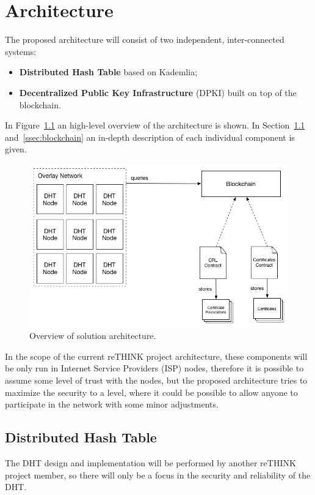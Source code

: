\chapter{Architecture}
\label{chapter:architecture}
The proposed architecture will consist of two independent, inter-connected systems:

\begin{itemize}
	\item \textbf{Distributed Hash Table} based on Kademlia;
	\item \textbf{Decentralized Public Key Infrastructure} (DPKI) built on top of the blockchain.
\end{itemize}

In Figure~\ref{fig:architecture-overview} an high-level overview of the architecture is shown. In Section~\ref{ssec:dht} and~\ref{ssec:blockchain} an in-depth description of each individual component is given.

\begin{figure}
    \includegraphics[width=\linewidth]{Figures/architecture-overview.png}
    \caption{Overview of solution architecture.}
    \label{fig:architecture-overview}
\end{figure}

In the scope of the current reTHINK project architecture, these components will be only run in Internet Service Providers (ISP) nodes, therefore it is possible to assume some level of trust with the nodes, but the proposed architecture tries to maximize the security to a level, where it could be possible to allow anyone to participate in the network with some minor adjustments.

\section{Distributed Hash Table} \label{ssec:dht}
The DHT design and implementation will be performed by another reTHINK project member, so there will only be a focus in the security and reliability of the DHT.


